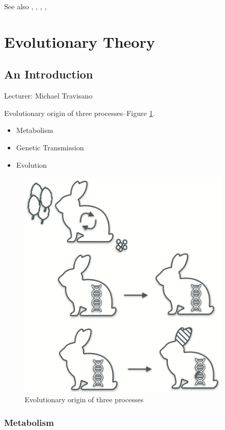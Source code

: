 \documentclass[]{article}
\begin{document}
See also   \cite{king1977symbiosis}, \cite{king1982recycling}, \cite{szathmary2000evolution},   \cite{virgo2016complex}, 
\section{Evolutionary Theory}

\subsection{An Introduction}

Lecturer: Michael Travisano

Evolutionary origin of three processes--Figure \ref{fig:EvolutionaryOrigin}.

\begin{itemize}
	\item Metabolism
	\item Genetic Transmission
	\item Evolution
\end{itemize}

\begin{figure}[H]
	\caption{Evolutionary origin of three processes}\label{fig:EvolutionaryOrigin}
	\includegraphics[width=0.9\textwidth]{EvolutionaryOrigin}
\end{figure}

\subsubsection{Metabolism}
\end{document}
